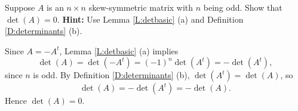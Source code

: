 \documentclass{ximera}
\begin{document}
\begin{exercise} \label{YZ_7.1_skewsym2}
Suppose $A$ is an $n\times n$ skew-symmetric matrix with $n$ being odd. Show that $\det(A)=0$.
{\bf Hint:} Use Lemma \ref{L:detbasic} (a) and Definition \ref{D:determinants} (b).

\begin{solution}
\soln
Since $A = -A^t$,  Lemma \ref{L:detbasic} (a) implies 
\[
\det(A) = \det(-A^t) = (-1)^n\det(A^t) = -\det(A^t),
\]
since $n$ is odd. By Definition \ref{D:determinants} (b), $\det(A^t)=\det(A)$, so 
\[
\det(A) = -\det(A^t)= -\det(A).
\]
Hence $\det(A) = 0$.

\end{solution}
\end{exercise}
\end{document}
